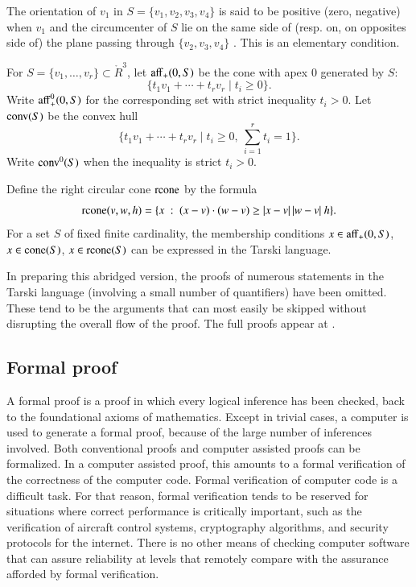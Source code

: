 \documentclass{article} %
\begin{document}

The orientation of $v_1$ in $S=\{v_1,v_2,v_3,v_4\}$ is said to be
positive (zero, negative) 
when $v_1$ and the circumcenter of $S$ lie on the same side of (resp. on, on opposites side of)  the
plane passing through $\{v_2,v_3,v_4\}$ \cite[Lemma~5.15]{Hales:2006:DCG}.  This is an elementary condition. 

For $S=\{v_1,\ldots,v_r\}\subset\ring{R}^3$, let ${\operatorname{aff}}_+(0,S)$
be the cone with apex $0$ generated by $S$:
$$
\{ t_1 v_1 + \cdots + t_r v_r \mid  t_i \ge 0\}.
$$
Write ${\operatorname{aff}}_+^0(0,S)$ for the corresponding set with
strict inequality $t_i >0$.
Let ${\operatorname{conv}}(S)$ be the convex hull
$$
\{ t_1 v_1 + \cdots + t_r v_r \mid t_i \ge 0,\ \sum_{i=1}^r t_i=1\}.
$$
Write ${\operatorname{conv}}^0(S)$ when the inequality is strict $t_i >0$.

Define the right circular cone ${\operatorname{rcone}}$ by the formula
$${\operatorname{rcone}}(v,w,h) = \{x\ :\  (x-v)\cdot (w-v) \ge |x-v|\,|w-v|\ h\}.$$
For a set $S$ of fixed finite cardinality, the membership conditions $x\in{\operatorname{aff}}_+(0,S)$,
$x\in{\operatorname{cone}}(S)$, $x\in{\operatorname{rcone}}(S)$ can be expressed
in the Tarski language.

In preparing this abridged version, the proofs of numerous statements
in the Tarski language (involving a small number of quantifiers) have
been omitted.  These tend to be the arguments that can most easily
be skipped without disrupting the overall flow of the proof.
The full proofs appear at \cite{Hales:2002:Dodec}.

\subsection{Formal proof}

A formal proof is a proof in which every logical inference has been
checked, back to the foundational axioms of mathematics. Except in
trivial cases, a computer is used to generate a formal proof, because
of the large number of inferences involved. Both conventional proofs
and computer assisted proofs can be formalized. In a computer assisted
proof, this amounts to a formal verification of the correctness of the
computer code. Formal verification of computer code is a difficult
task. For that reason, formal verification tends to be reserved for
situations where correct performance is critically important, such as
the verification of aircraft control systems, cryptography algorithms,
and security protocols for the internet. There is no other means of
checking computer software that can assure reliability at levels that
remotely compare with the assurance afforded by formal verification.
\end{document}
